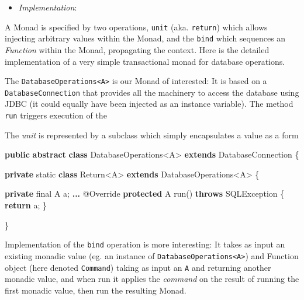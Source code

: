 \documentclass[11pt,]{article}
\newenvironment{Shaded}{}{}
\newcommand{\KeywordTok}[1]{\textcolor[rgb]{0.00,0.44,0.13}{\textbf{{#1}}}}
\newcommand{\DataTypeTok}[1]{\textcolor[rgb]{0.56,0.13,0.00}{{#1}}}
\newcommand{\FunctionTok}[1]{\textcolor[rgb]{0.02,0.16,0.49}{{#1}}}
\newcommand{\NormalTok}[1]{{#1}}
\begin{document}
\begin{itemize}
\item
  \emph{Implementation}:
\end{itemize}

A Monad is specified by two operations, \texttt{unit} (aka.
\texttt{return}) which allows injecting arbitrary values within the
Monad, and the \texttt{bind} which sequences an \emph{Function} within
the Monad, propagating the context. Here is the detailed implementation
of a very simple transactional monad for database operations.

The \texttt{DatabaseOperations\textless{}A\textgreater{}} is our Monad
of interested: It is based on a \texttt{DatabaseConnection} that
provides all the machinery to access the database using JDBC (it could
equally have been injected as an instance variable). The method
\texttt{run} triggers execution of the

The \emph{unit} is represented by a subclass which simply encapsulates a
value as a form

\begin{Shaded}
\begin{Highlighting}[]
\KeywordTok{public} \KeywordTok{abstract} \KeywordTok{class} \NormalTok{DatabaseOperations<A> }\KeywordTok{extends} \NormalTok{DatabaseConnection \{}
  
  \KeywordTok{private} \DataTypeTok{static} \KeywordTok{class} \NormalTok{Return<A> }\KeywordTok{extends} \NormalTok{DatabaseOperations<A> \{}
    
    \KeywordTok{private} \DataTypeTok{final} \NormalTok{A a;}
    \KeywordTok{...    }
    \NormalTok{@Override}
    \KeywordTok{protected} \NormalTok{A }\FunctionTok{run}\NormalTok{() }\KeywordTok{throws} \NormalTok{SQLException \{}
      \KeywordTok{return} \NormalTok{a;}
    \NormalTok{\}}
    
  \NormalTok{\}}
\end{Highlighting}
\end{Shaded}

Implementation of the \texttt{bind} operation is more interesting: It
takes as input an existing monadic value (eg. an instance of
\texttt{DatabaseOperations\textless{}A\textgreater{}}) and Function
object (here denoted \texttt{Command}) taking as input an \texttt{A} and
returning another monadic value, and when run it applies the
\emph{command} on the result of running the first monadic value, then
run the resulting Monad.
\end{document}
